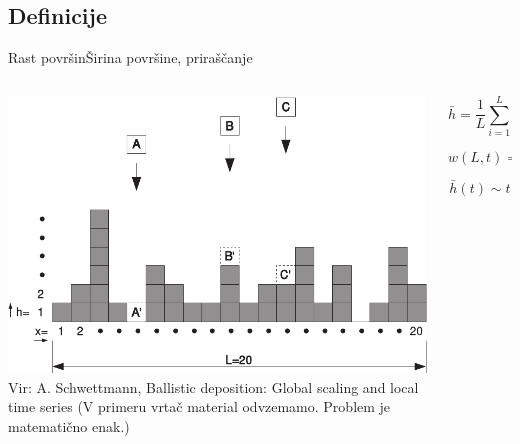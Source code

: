 \documentclass{beamer}
\begin{document}
\subsection{Definicije}

\begin{frame}{Rast površin}{Širina površine, priraščanje}
\begin{columns}
  \begin{column}{0.45\textwidth}
     \hspace*{-0.05\textwidth}\includegraphics[width=1.1\textwidth]{slike/bdep2.pdf}
     \newline
     \newline
     \tiny{Vir: A. Schwettmann, Ballistic deposition: Global scaling and local time series}
     \newline \newline
     \tiny{(V primeru vrtač material odvzemamo. Problem je matematično enak.)}
  \end{column}

  \begin{column}{0.55\textwidth}
    \footnotesize
    \begin{equation} \bar{h} = \frac{1}{L} \sum_{i=1}^L h(i,t) \end{equation}
    \newline
    \begin{equation} w(L,t) = \sqrt{\frac{1}{L} \sum_{i=1}^L (h(i,t)-\bar{h}(t))^2} \end{equation}
    \newline
    \begin{equation} \bar{h}(t) \sim t \end{equation}
  \end{column}
\end{columns}
\end{frame}
\end{document}
